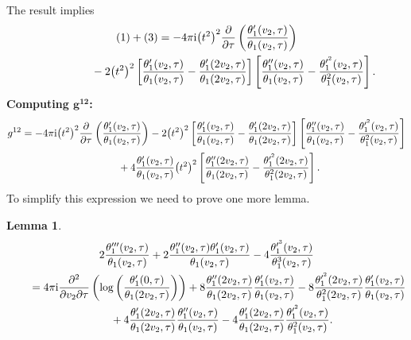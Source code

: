 \documentclass[pdftex]{sigma}%
\numberwithin{equation}{section}
\newtheorem{Lemma}[Theorem]{Lemma}
\begin{document}
The result implies
\begin{gather*}
(1) + (3) =-4\pi {\rm i}\big(t^2\big)^2\frac{\partial}{\partial \tau}\left(\frac{\theta_1^{\prime}(v_2,\tau)}{\theta_1(v_2,\tau)}\right)\\
\hphantom{(1) + (3) =}{}
 - 2\big(t^2\big)^2\left[\frac{\theta_1^{\prime}(v_2,\tau)}{\theta_1(v_2,\tau)} - \frac{\theta_1^{\prime}(2v_2,\tau)}{\theta_1(2v_2,\tau)}\right] \left[\frac{\theta_1^{\prime\prime}(v_2,\tau)}{\theta_1(v_2,\tau)} - \frac{\theta_1^{\prime^2}(v_2,\tau)}{\theta_1^2(v_2,\tau)}\right] .
\end{gather*}
\textbf{Computing $\boldsymbol {g^{12}}$:}
\begin{gather*}
g^{12}=-4\pi {\rm i}\big(t^2\big)^2\frac{\partial}{\partial \tau}\left(\frac{\theta_1^{\prime}(v_2,\tau)}{\theta_1(v_2,\tau)}\right)
-2\big(t^2\big)^2\left[\frac{\theta_1^{\prime}(v_2,\tau)}{\theta_1(v_2,\tau)} -\frac{\theta_1^{\prime}(2v_2,\tau)}{\theta_1(2v_2,\tau)}\right] \left[\frac{\theta_1^{\prime\prime}(v_2,\tau)}{\theta_1(v_2,\tau)} -\frac{\theta_1^{\prime^2}(v_2,\tau)}{\theta_1^2(v_2,\tau)}\right]
\\ \hphantom{g^{12}=}
{}+4\frac{\theta_1^{\prime}(v_2,\tau)}{\theta_1(v_2,\tau)}\big(t^2\big)^2 \left[\frac{\theta_1^{\prime\prime}(2v_2,\tau)}{\theta_1(2v_2,\tau)} -\frac{\theta_1^{\prime^2}(2v_2,\tau)}{\theta_1^2(2v_2,\tau)}\right].
\end{gather*}
To simplify this expression we need to prove one more lemma.

\begin{Lemma}
\begin{gather}
2\frac{\theta_1^{\prime\prime\prime}(v_2,\tau)}{\theta_1(v_2,\tau)} +2\frac{\theta_1^{\prime\prime}(v_2,\tau)\theta_1^{\prime}(v_2,\tau)}{\theta_1(v_2,\tau)} -4\frac{\theta_1^{\prime^3}(v_2,\tau)}{\theta_1^3(v_2,\tau)}\nonumber
\\ \qquad
{}=4\pi {\rm i} \frac{\partial^2}{\partial v_2\partial \tau}\left( \log\left(\frac{\theta_1^{\prime}(0,\tau)}{\theta_1(2v_2,\tau)}\right)\right)
+8\frac{\theta_1^{\prime\prime}(2v_2,\tau)}{\theta_1(2v_2,\tau)} \frac{\theta_1^{\prime}(v_2,\tau)}{\theta_1(v_2,\tau)} -8\frac{\theta_1^{\prime^2}(2v_2,\tau)}{\theta_1^2(2v_2,\tau)} \frac{\theta_1^{\prime}(v_2,\tau)}{\theta_1(v_2,\tau)}\nonumber
\\ \qquad\hphantom{=}
{}+4\frac{\theta_1^{\prime}(2v_2,\tau)}{\theta_1(2v_2,\tau)} \frac{\theta_1^{\prime\prime}(v_2,\tau)}{\theta_1(v_2,\tau)}
-4\frac{\theta_1^{\prime}(2v_2,\tau)}{\theta_1(2v_2,\tau)} \frac{\theta_1^{\prime^2}(v_2,\tau)}{\theta_1^2(v_2,\tau)}.
\label{lemmaa2}
\end{gather}
\end{Lemma}
\end{document}
